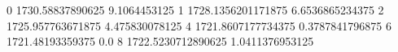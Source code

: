 0 1730.58837890625 9.1064453125
1 1728.1356201171875 6.6536865234375
2 1725.957763671875 4.475830078125
4 1721.8607177734375 0.3787841796875
6 1721.48193359375 0.0
8 1722.5230712890625 1.0411376953125
